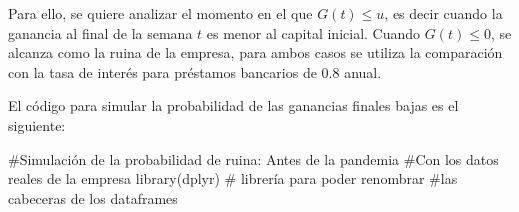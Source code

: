\documentclass[
  us-letterpaper,
]{scrreprt}
\newenvironment{Shaded}{\begin{snugshade}}{\end{snugshade}}
\newcommand{\CommentTok}[1]{\textcolor[rgb]{0.37,0.37,0.37}{#1}}
\newcommand{\FunctionTok}[1]{\textcolor[rgb]{0.28,0.35,0.67}{#1}}
\newcommand{\NormalTok}[1]{\textcolor[rgb]{0.00,0.23,0.31}{#1}}
\theoremstyle{plain}
\theoremstyle{plain}
\theoremstyle{definition}
\theoremstyle{remark}
\begin{document}
Para ello, se quiere analizar el momento en el que \(G(t)\leq u\), es
decir cuando la ganancia al final de la semana \(t\) es menor al capital
inicial. Cuando \(G(t)\leq0\), se alcanza como la ruina de la empresa,
para ambos casos se utiliza la comparación con la tasa de interés para
préstamos bancarios de \(0.8\) anual.

El código para simular la probabilidad de las ganancias finales bajas es
el siguiente:

\begin{Shaded}
\begin{Highlighting}[]
\CommentTok{\#Simulación de la probabilidad de ruina: Antes de la pandemia}
\CommentTok{\#Con los datos reales de la empresa}
\FunctionTok{library}\NormalTok{(dplyr) }\CommentTok{\# librería para poder renombrar }
\CommentTok{\#las cabeceras de los dataframes}


\end{Highlighting}
\end{Shaded}
\end{document}
